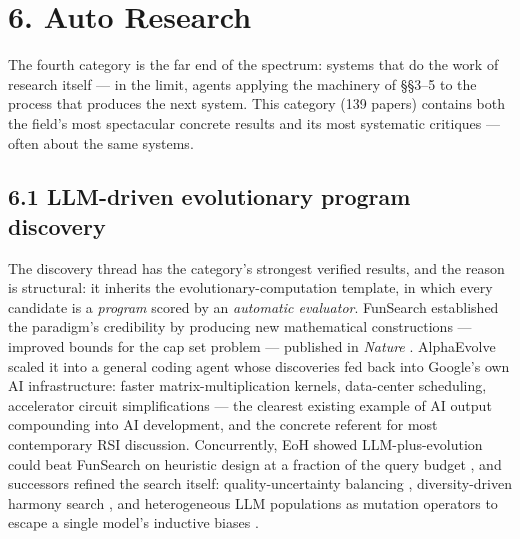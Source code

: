\documentclass[
  11pt,
]{article}
\begin{document}
\section{6. Auto Research}\label{auto-research}

The fourth category is the far end of the spectrum: systems that do the
work of research itself --- in the limit, agents applying the machinery
of §§3--5 to the process that produces the next system. This category
(139 papers) contains both the field's most spectacular concrete results
and its most systematic critiques --- often about the same systems.

\subsection{6.1 LLM-driven evolutionary program
discovery}\label{llm-driven-evolutionary-program-discovery}

The discovery thread has the category's strongest verified results, and
the reason is structural: it inherits the evolutionary-computation
template, in which every candidate is a \emph{program} scored by an
\emph{automatic evaluator}. FunSearch established the paradigm's
credibility by producing new mathematical constructions --- improved
bounds for the cap set problem --- published in \emph{Nature}
\citep{romeraparedes2024funsearch}. AlphaEvolve scaled it into a general
coding agent whose discoveries fed back into Google's own AI
infrastructure: faster matrix-multiplication kernels, data-center
scheduling, accelerator circuit simplifications
\citep{novikov2025alphaevolve} --- the clearest existing example of AI
output compounding into AI development, and the concrete referent for
most contemporary RSI discussion. Concurrently, EoH showed
LLM-plus-evolution could beat FunSearch on heuristic design at a
fraction of the query budget \citep{liu2024evolution}, and successors
refined the search itself: quality-uncertainty balancing
\citep{chen2024qube}, diversity-driven harmony search
\citep{dat2024hsevo}, and heterogeneous LLM populations as mutation
operators to escape a single model's inductive biases
\citep{donaghy2026dei}.
\end{document}
